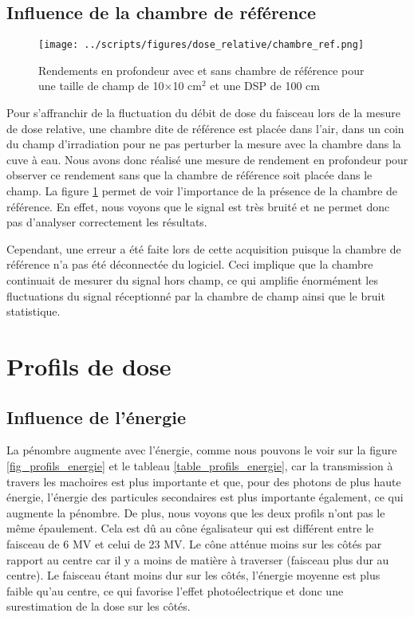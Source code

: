 \documentclass{book}
\begin{document}
\newpage
\subsection{Influence de la chambre de référence}

\begin{figure}[h!]
  \centering
  \texttt{[image: ../scripts/figures/dose\_relative/chambre\_ref.png]}
  \caption{Rendements en profondeur avec et sans chambre de référence pour une taille de champ de 10$\times$10 cm$^2$ et une DSP de 100 cm}
  \label{fig_sanss_chambre_ref}
\end{figure}

Pour s'affranchir de la fluctuation du débit de dose du faisceau lors de la mesure de dose relative, une chambre dite de référence est placée dans l'air, dans un coin du champ d'irradiation pour ne pas perturber la mesure avec la chambre dans la cuve à eau. Nous avons donc réalisé une mesure de rendement en profondeur pour observer ce rendement sans que la chambre de référence soit placée dans le champ. La figure \ref*{fig_sanss_chambre_ref} permet de voir l'importance de la présence de la chambre de référence. En effet, nous voyons que le signal est très bruité et ne permet donc pas d'analyser correctement les résultats.

Cependant, une erreur a été faite lors de cette acquisition puisque la chambre de référence n'a pas été déconnectée du logiciel. Ceci implique que la chambre continuait de mesurer du signal hors champ, ce qui amplifie énormément les fluctuations du signal réceptionné par la chambre de champ ainsi que le bruit statistique.

\section{Profils de dose}
\subsection{Influence de l'énergie}

La pénombre augmente avec l'énergie, comme nous pouvons le voir sur la figure \ref*{fig_profils_energie} et le tableau \ref*{table_profils_energie}, car la transmission à travers les machoires est plus importante et que, pour des photons de plus haute énergie, l'énergie des particules secondaires est plus importante également, ce qui augmente la pénombre. De plus, nous voyons que les deux profils n'ont pas le même épaulement. Cela est dû au cône égalisateur qui est différent entre le faisceau de 6 MV et celui de 23 MV. Le cône atténue moins sur les côtés par rapport au centre car il y a moins de matière à traverser (faisceau plus dur au centre). Le faisceau étant moins dur sur les côtés, l'énergie moyenne est plus faible qu'au centre, ce qui favorise l'effet photoélectrique et donc une surestimation de la dose sur les côtés.
\end{document}
